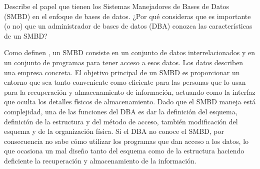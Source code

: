 \item Describe el papel que tienen los Sistemas Manejadores de Bases de Datos (SMBD) en el enfoque de bases de datos. ¿Por qué consideras que es importante (o no) que un administrador de bases de datos (DBA) conozca las características de un SMBD?

Como definen \textcite{silberschatz_fundamentos_2006}, un SMBD consiste en un conjunto de datos interrelacionados y en un conjunto de programas para tener acceso a esos datos. Los datos describen una empresa concreta. El objetivo principal de un SMBD es proporcionar un entorno que sea tanto conveniente como eficiente para las personas que lo usan para la recuperación y almacenamiento de información, actuando como la interfaz que oculta los detalles físicos de almacenamiento. Dado que el SMBD maneja está complejidad, una de las funciones del DBA es dar la definición del esquema, definición de la estructura y del método de acceso, también modificación del esquema y de la organización física. Si el DBA no conoce el SMBD, por consecuencia no sabe cómo utilizar los programas que dan acceso a los datos, lo que ocasiona un mal diseño tanto del esquema como de la estructura haciendo deficiente la recuperación y almacenamiento de la información.
